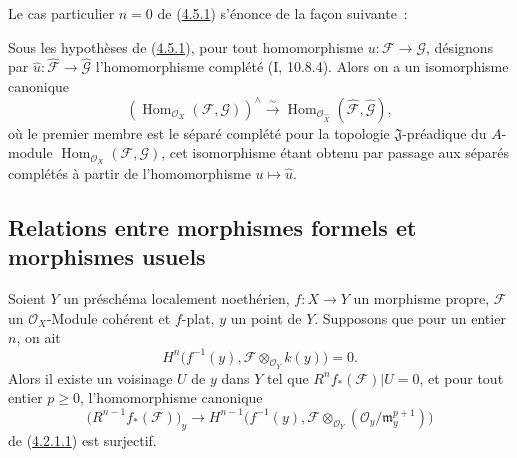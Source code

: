 Le cas particulier $n=0$ de (\hyperref[III.4.5.1-fr]{4.5.1}) s'énonce de la
façon suivante~:

\begin{corollary}[4.5.3]
\label{III.4.5.3-fr}
Sous les hypothèses de (\hyperref[III.4.5.1-fr]{4.5.1}), pour tout
homomorphisme $u:\mathcal F\to\mathcal G$, désignons par
$\widehat u:\widehat{\mathcal F}\to\widehat{\mathcal G}$ l'homomorphisme
complété (I, 10.8.4). Alors on a un isomorphisme canonique
\[
\label{III.4.5.3.1-fr}
\left(\operatorname{Hom}_{\mathcal O_X}(\mathcal F,\mathcal G)\right)^\wedge
\xrightarrow{\sim}
\operatorname{Hom}_{\mathcal O_{\widehat X}}
(\widehat{\mathcal F},\widehat{\mathcal G}),
\tag{4.5.3.1}
\]
où le premier membre est le séparé complété pour la topologie
$\mathfrak J$-préadique du $A$-module
$\operatorname{Hom}_{\mathcal O_X}(\mathcal F,\mathcal G)$, cet isomorphisme étant obtenu
par passage aux séparés complétés à partir de l'homomorphisme
$u\mapsto\widehat u$.
\end{corollary}

\subsection{Relations entre morphismes formels et morphismes usuels}

\begin{proposition}[4.6.1]
\label{III.4.6.1-fr}
Soient $Y$ un préschéma localement noethérien, $f:X\to Y$ un morphisme
propre, $\mathcal F$ un $\mathcal O_X$-Module cohérent et $f$-plat, $y$ un
point de $Y$. Supposons que pour un entier $n$, on ait
\[
H^n\bigl(f^{-1}(y),\mathcal F\otimes_{\mathcal O_Y}k(y)\bigr)=0.
\]
Alors il existe un voisinage $U$ de $y$ dans $Y$ tel que
$R^nf_*(\mathcal F)|U=0$, et pour tout entier $p\geq0$, l'homomorphisme
canonique
\[
\bigl(R^{n-1}f_*(\mathcal F)\bigr)_y
\longrightarrow
H^{n-1}\bigl(f^{-1}(y),
\mathcal F\otimes_{\mathcal O_Y}
(\mathcal O_y/\mathfrak m_y^{p+1})\bigr)
\]
de (\hyperref[III.4.2.1.1-fr]{4.2.1.1}) est surjectif.
\end{proposition}

